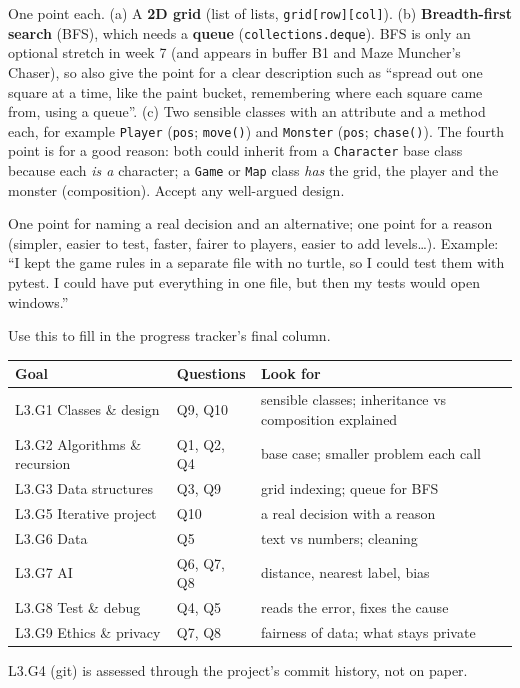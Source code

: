 \begin{answer}
One point each. (a) A \textbf{2D grid} (list of lists, \texttt{grid[row][col]}). (b)
\textbf{Breadth-first search} (BFS), which needs a \textbf{queue} (\texttt{collections.deque}).
BFS is only an optional stretch in week 7 (and appears in buffer B1 and Maze Muncher's Chaser),
so also give the point for a clear description such as \enquote{spread out one square at a time, like the
paint bucket, remembering where each square came from, using a queue}.
(c) Two sensible classes with an attribute and a method each, for example \texttt{Player}
(\texttt{pos}; \texttt{move()}) and \texttt{Monster} (\texttt{pos}; \texttt{chase()}). The fourth point is for a good
reason: both could inherit from a \texttt{Character} base class because each \emph{is a}
character; a \texttt{Game} or \texttt{Map} class \emph{has} the grid, the player and the monster
(composition). Accept any well-argued design.
\end{answer}

\begin{answer}
One point for naming a real decision and an alternative; one point for a reason (simpler, easier
to test, faster, fairer to players, easier to add levels\ldots). Example: \enquote{I kept the game
rules in a separate file with no turtle, so I could test them with pytest. I could have put
everything in one file, but then my tests would open windows.}
\end{answer}

\begin{rubric}
Use this to fill in the progress tracker's final column.
\begin{center}
\renewcommand{\arraystretch}{1.25}
\begin{tabularx}{\linewidth}{@{}>{\raggedright\arraybackslash}p{4.6cm}>{\raggedright\arraybackslash}p{2.3cm}>{\raggedright\arraybackslash}X@{}}
\toprule
Goal & Questions & Look for\\ \midrule
L3.G1 Classes \& design & Q9, Q10 & sensible classes; inheritance vs composition explained\\
L3.G2 Algorithms \& recursion & Q1, Q2, Q4 & base case; smaller problem each call\\
L3.G3 Data structures & Q3, Q9 & grid indexing; queue for BFS\\
L3.G5 Iterative project & Q10 & a real decision with a reason\\
L3.G6 Data & Q5 & text vs numbers; cleaning\\
L3.G7 AI & Q6, Q7, Q8 & distance, nearest label, bias\\
L3.G8 Test \& debug & Q4, Q5 & reads the error, fixes the cause\\
L3.G9 Ethics \& privacy & Q7, Q8 & fairness of data; what stays private\\
\bottomrule
\end{tabularx}
\end{center}
L3.G4 (git) is assessed through the project's commit history, not on paper.
\end{rubric}

